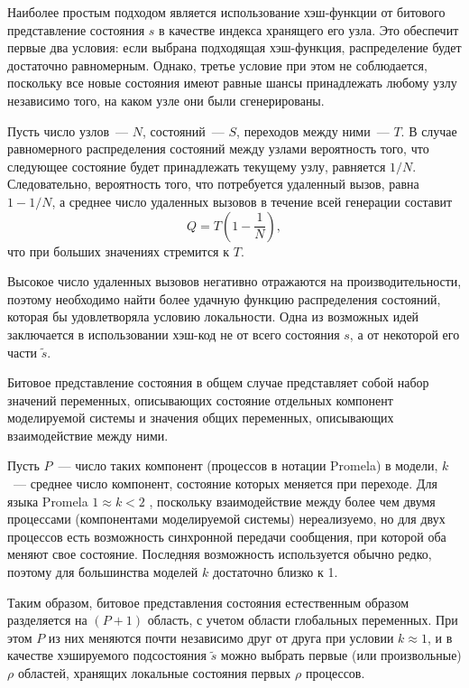 \documentclass[12pt,a4paper,article]{bpm2}
\begin{document}
Наиболее простым подходом является использование хэш-функции от битового представление состояния $s$ в качестве индекса
хранящего его узла.
Это обеспечит первые два условия: если выбрана подходящая хэш-функция, распределение будет
достаточно равномерным.
Однако, третье условие при этом не соблюдается, поскольку все новые состояния имеют равные шансы
принадлежать любому узлу независимо того, на каком узле они были сгенерированы.

Пусть число узлов~--- $N$, состояний~--- $S$, переходов между ними~--- $T$.
В случае равномерного распределения состояний между узлами вероятность того, что следующее состояние будет принадлежать текущему узлу, равняется $1/N$.
Следовательно, вероятность того, что потребуется удаленный вызов, равна $1 - 1/N$, а среднее число удаленных
вызовов в течение всей генерации составит
\[\label{eq:rpc-partfull}
  Q = T (1 - \frac{1}{N}),
\]
что при больших значениях стремится к $T$.

Высокое число удаленных вызовов негативно отражаются на производительности, поэтому необходимо найти более удачную
функцию распределения состояний, которая бы удовлетворяла условию локальности.
Одна из возможных идей заключается в использовании хэш-код не от всего состояния $s$, а от некоторой его части $\tilde{s}$.

Битовое представление состояния в общем случае представляет собой набор значений переменных, описывающих состояние отдельных компонент моделируемой системы и значения общих переменных, описывающих взаимодействие между ними.

Пусть $P$~--- число таких компонент (процессов в нотации Promela) в модели, $k$~--- среднее число компонент, состояние которых меняется при переходе. Для языка Promela $1 \approx k < 2$ , поскольку взаимодействие между более чем двумя процессами (компонентами моделируемой системы) нереализуемо, но для двух процессов есть возможность синхронной передачи сообщения, при которой оба меняют свое состояние.
Последняя возможность используется обычно редко, поэтому для большинства моделей $k$ достаточно близко к 1.

Таким образом, битовое представления состояния естественным образом разделяется на $(P+1)$ область, с учетом области глобальных переменных.
При этом $P$ из них меняются почти независимо друг от друга при условии $k \approx 1$, и в качестве хэшируемого подсостояния $\tilde{s}$ можно выбрать первые (или произвольные) $\rho$ областей, хранящих локальные состояния первых $\rho$ процессов.
\end{document}
